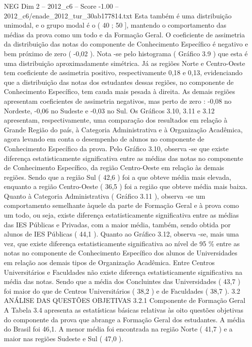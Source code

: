 \begin{textsample}{NEG Dim 2 – 2012\_c6 – Score -1.00 – 2012\_c6/enade\_2012\_tur\_30ab177814.txt}
Esta também é uma distribuição unimodal, e o grupo modal é o ( 40 ; 50 ], mantendo o comportamento das médias da prova como um todo e da Formação Geral.
O coeficiente de assimetria da distribuição das notas do componente de Conhecimento Específico é negativo e bem próximo de zero ( -0,02 ).
Nota -se pelo histograma ( Gráfico 3.9 ) que esta é uma distribuição aproximadamente simétrica.
Já as regiões Norte e Centro-Oeste tem coeficiente de assimetria positivo, respectivamente 0,18 e 0,13, evidenciando que a distribuição das notas dos estudantes dessas regiões, no componente de Conhecimento Específico, tem cauda mais pesada à direita.
As demais regiões apresentam coeficientes de assimetria negativos, mas perto de zero : -0,08 no Nordeste, -0,06 no Sudeste e -0,03 no Sul.
Os Gráficos 3.10, 3.11 e 3.12 apresentam, respectivamente, uma comparação dos resultados em relação à Grande Região do país, à Categoria Administrativa e à Organização Acadêmica, agora levando em conta o desempenho de alunos no componente de Conhecimento Específico da prova.
Pelo Gráfico 3.10, observa -se que existe diferença estatisticamente significativa entre as médias das notas no componente de Conhecimento Específico, da região Centro-Oeste em relação às demais regiões.
Sendo que a região Sul ( 42,6 ) foi a que obteve média mais elevada, enquanto a região Centro-Oeste ( 36,5 ) foi a região que obteve média mais baixa.
Quanto à Categoria Administrativa ( Gráfico 3.11 ), observa -se um comportamento semelhante àquele da parte de Formação Geral e à prova como um todo, ou seja, existe diferença estatisticamente significativa entre as médias das IES Públicas e Privadas, com a maior média, também, sendo obtida por alunos de IES Públicas ( 44,1 ).
Quanto ao Gráfico 3.12, observa -se, mais uma vez, que existe diferença estatisticamente significativa ao nível de 95 \% entre as notas no componente de Conhecimento Específico dos alunos de Universidades em relação aos demais tipos de Organização Acadêmica.
Entre Centros Universitários e Faculdades não existe diferença estatisticamente significativa na média das notas.
Sendo que a média dos Concluintes das Universidades ( 43,7 ) foi maior do que de Centros Universitários ( 38,2 ) e de Faculdades ( 38,7 ). 3.2 ANÁLISE DAS QUESTÕES OBJETIVAS 3.2.1 Componente de Formação Geral A Tabela 3.4 apresenta as estatísticas básicas relativas às oito questões objetivas do componente da prova que abrange a Formação Geral dos estudantes.
A média do Brasil foi 46,1.
A menor média foi encontrada na região Norte ( 41,7 ) e a maior nas regiões Sudeste e Sul ( 47,0 ).

\end{textsample}
